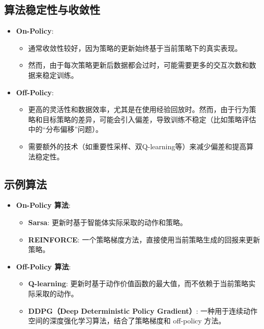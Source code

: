 \documentclass[twocolumn, 10pt]{article} %
\theoremstyle{remark}
\begin{document}
\subsection{算法稳定性与收敛性}

\begin{itemize}
    \item \textbf{On-Policy}:
    \begin{itemize}
        \item 通常收敛性较好，因为策略的更新始终基于当前策略下的真实表现。
        \item 然而，由于每次策略更新后数据都会过时，可能需要更多的交互次数和数据来稳定训练。
    \end{itemize}
    
    \item \textbf{Off-Policy}:
    \begin{itemize}
        \item 更高的灵活性和数据效率，尤其是在使用经验回放时。然而，由于行为策略和目标策略的差异，可能会引入偏差，导致训练不稳定（比如策略评估中的“分布偏移”问题）。
        \item 需要额外的技术（如重要性采样、双Q-learning等）来减少偏差和提高算法稳定性。
    \end{itemize}
\end{itemize}

\subsection{示例算法}

\begin{itemize}
    \item \textbf{On-Policy 算法}:
    \begin{itemize}
        \item \textbf{Sarsa}: 更新时基于智能体实际采取的动作和策略。
        \item \textbf{REINFORCE}: 一个策略梯度方法，直接使用当前策略生成的回报来更新策略。
    \end{itemize}
    
    \item \textbf{Off-Policy 算法}:
    \begin{itemize}
        \item \textbf{Q-learning}: 更新时基于动作价值函数的最大值，而不依赖于当前策略实际采取的动作。
        \item \textbf{DDPG（Deep Deterministic Policy Gradient）}: 一种用于连续动作空间的深度强化学习算法，结合了策略梯度和 off-policy 方法。
    \end{itemize}
\end{itemize}
\end{document}
